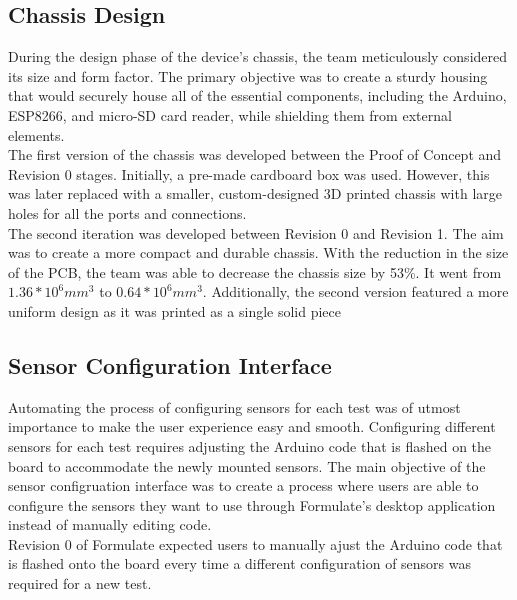 \documentclass[12pt]{article}
\begin{document}
\subsection{Chassis Design}
During the design phase of the device's chassis, the team meticulously considered its size and form factor. The primary objective was to create a sturdy housing that would securely house all of the essential components, including the Arduino, ESP8266, and micro-SD card reader, while shielding them from external elements.\\

The first version of the chassis was developed between the Proof of Concept and Revision 0 stages. Initially, a pre-made cardboard box was used. However, this was later replaced with a smaller, custom-designed 3D printed chassis with large holes for all the ports and connections.\\

The second iteration was developed between Revision 0 and Revision 1. The aim was to create a more compact and durable chassis. With the reduction in the size of the PCB, the team was able to decrease the chassis size by 53\%. It went from $1.36*10^6 mm^3$ to $0.64*10^6mm^3$. Additionally, the second version featured a more uniform design as it was printed as a single solid piece
\subsection{Sensor Configuration Interface}
Automating the process of configuring sensors for each test was of utmost importance to make the user experience easy and smooth. Configuring different sensors
for each test requires adjusting the Arduino code that is flashed on the board to accommodate the newly mounted sensors. The main
objective of the sensor configruation interface was to create a process where users are able to configure the sensors they want to use through
Formulate's desktop application instead of manually editing code. \\

Revision 0 of Formulate expected users to manually ajust the Arduino code that is flashed onto the board every time a different configuration
of sensors was required for a new test. \\
\end{document}
